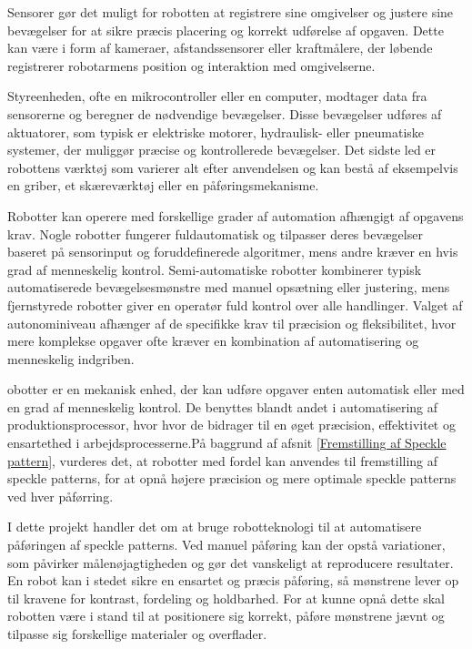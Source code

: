 Sensorer gør det muligt for robotten at registrere sine omgivelser og justere sine bevægelser for at sikre præcis placering og korrekt udførelse af opgaven. Dette kan være i form af kameraer, afstandssensorer eller kraftmålere, der løbende registrerer robotarmens position og interaktion med omgivelserne. 

Styreenheden, ofte en mikrocontroller eller en computer, modtager data fra sensorerne og beregner de nødvendige bevægelser. Disse bevægelser udføres af aktuatorer, som typisk er elektriske motorer, hydraulisk- eller pneumatiske systemer, der muliggør præcise og kontrollerede bevægelser. Det sidste led er  robottens værktøj som varierer alt efter anvendelsen og kan bestå af eksempelvis en griber, et skæreværktøj eller en påføringsmekanisme.\parencite{TextbookofRobotics}

Robotter kan operere med forskellige grader af automation afhængigt af opgavens krav. Nogle robotter fungerer fuldautomatisk og tilpasser deres bevægelser baseret på sensorinput og foruddefinerede algoritmer, mens andre kræver en hvis grad af menneskelig kontrol. Semi-automatiske robotter kombinerer typisk automatiserede bevægelsesmønstre med manuel opsætning eller justering, mens fjernstyrede robotter giver en operatør fuld kontrol over alle handlinger. Valget af autonominiveau afhænger af de specifikke krav til præcision og fleksibilitet, hvor mere komplekse opgaver ofte kræver en kombination af automatisering og menneskelig indgriben.\parencite{BasicsofRobotics}


obotter er en mekanisk enhed, der kan udføre opgaver enten automatisk eller  med en grad af menneskelig kontrol. De benyttes blandt andet i automatisering af produktionsprocessor, hvor hvor de bidrager til en øget præcision, effektivitet og ensartethed i arbejdsprocesserne.På baggrund af afsnit \ref{Fremstilling af Speckle pattern}, vurderes det, at robotter med fordel kan anvendes til fremstilling af speckle patterns, for at opnå højere præcision og mere optimale speckle patterns ved hver påførring.  

I dette projekt handler det om at bruge robotteknologi til at automatisere påføringen af speckle patterns. Ved manuel påføring kan der opstå variationer, som påvirker målenøjagtigheden og gør det vanskeligt at reproducere resultater. En robot kan i stedet sikre en ensartet og præcis påføring, så mønstrene lever op til kravene for kontrast, fordeling og holdbarhed. For at kunne opnå dette skal robotten være i stand til at positionere sig korrekt, påføre mønstrene jævnt og tilpasse sig forskellige materialer og overflader.

